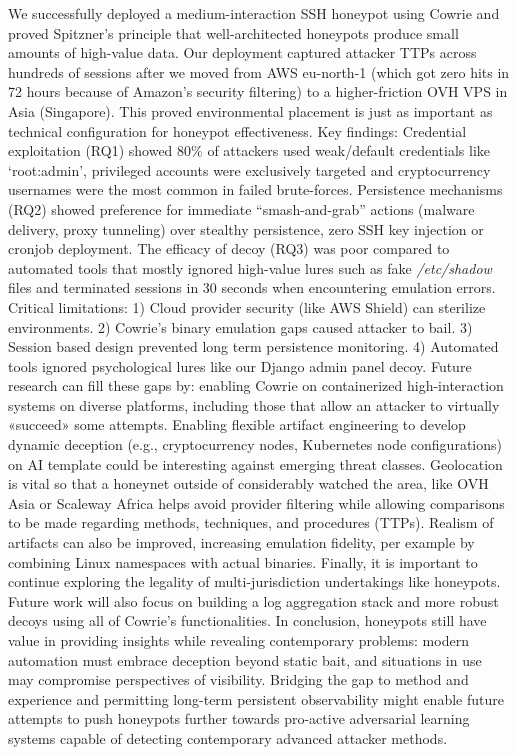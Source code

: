 \documentclass{cls/ULBreport}
\begin{document}
We successfully deployed a medium-interaction SSH honeypot using Cowrie and proved Spitzner’s principle that well-architected honeypots produce small amounts of high-value data. Our deployment captured attacker TTPs across hundreds of sessions after we moved from AWS eu-north-1 (which got zero hits in 72 hours because of Amazon’s security filtering) to a higher-friction OVH VPS in Asia (Singapore). This proved environmental placement is just as important as technical configuration for honeypot effectiveness. Key findings: Credential exploitation (RQ1) showed 80{\%} of attackers used weak/default credentials like ‘root:admin’, privileged accounts were exclusively targeted and cryptocurrency usernames were the most common in failed brute-forces. Persistence mechanisms (RQ2) showed preference for immediate “smash-and-grab” actions (malware delivery, proxy tunneling) over stealthy persistence, zero SSH key injection or cronjob deployment.
The efficacy of decoy (RQ3) was poor compared to automated tools that mostly ignored high-value lures such as fake \textit{ /etc/shadow} files and terminated sessions in 30 seconds when encountering emulation errors.
Critical limitations: 1) Cloud provider security (like AWS Shield) can sterilize environments. 2) Cowrie’s binary emulation gaps caused attacker to bail. 3) Session based design prevented long term persistence monitoring. 4) Automated tools ignored psychological lures like our Django admin panel decoy.
Future research can fill these gaps by: enabling Cowrie on containerized high-interaction systems on diverse platforms, including those that allow an attacker to virtually «succeed» some attempts. Enabling flexible artifact engineering to develop dynamic deception (e.g., cryptocurrency nodes, Kubernetes node configurations) on AI template could be interesting against emerging threat classes. Geolocation is vital so that a honeynet outside of considerably watched the area, like OVH Asia or Scaleway Africa helps avoid provider filtering while allowing comparisons to be made regarding methods, techniques, and procedures (TTPs). Realism of artifacts can also be improved, increasing emulation fidelity, per example by combining Linux namespaces with actual binaries. Finally, it is important to continue exploring the legality of multi-jurisdiction undertakings like honeypots. Future work will also focus on building a log aggregation stack and more robust decoys using all of Cowrie's functionalities. 
In conclusion, honeypots still have value in providing insights while revealing contemporary problems: modern automation must embrace deception beyond static bait, and situations in use may compromise perspectives of visibility. Bridging the gap to method and experience and permitting long-term persistent observability might enable future attempts to push honeypots further towards pro-active adversarial learning systems capable of detecting contemporary advanced attacker methods.
\end{document}
